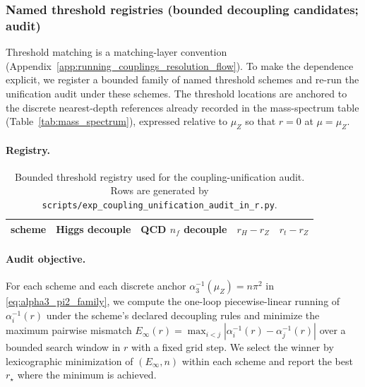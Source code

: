 \subsubsection{Named threshold registries (bounded decoupling candidates; audit)}
\label{subsec:coupling_unification_threshold_registry}
\AuditTag Threshold matching is a matching-layer convention (Appendix~\ref{app:running_couplings_resolution_flow}).
To make the dependence explicit, we register a bounded family of named threshold schemes and re-run the unification audit under these schemes.
The threshold locations are anchored to the discrete nearest-depth references already recorded in the mass-spectrum table (Table~\ref{tab:mass_spectrum}), expressed relative to $\mu_Z$ so that $r=0$ at $\mu=\mu_Z$.

\paragraph{Registry.}
\begin{table}[H]
\centering
\small
\setlength{\tabcolsep}{8pt}
\renewcommand{\arraystretch}{1.15}
\begin{tabular}{lrrrr}
\toprule
scheme & Higgs decouple & QCD $n_f$ decouple & $r_H-r_Z$ & $r_t-r_Z$ \\
\midrule
%
\end{tabular}
\caption{Bounded threshold registry used for the coupling-unification audit. Rows are generated by \texttt{scripts/exp\_coupling\_unification\_audit\_in\_r.py}.}
\label{tab:coupling_unification_threshold_registry}
\end{table}

\paragraph{Audit objective.}
\AuditTag For each scheme and each discrete anchor $\alpha_3^{-1}(\mu_Z)=n\pi^2$ in \eqref{eq:alpha3_pi2_family},
we compute the one-loop piecewise-linear running of $\alpha_i^{-1}(r)$ under the scheme's declared decoupling rules and minimize the maximum pairwise mismatch
$
E_\infty(r)=\max_{i<j}|\alpha_i^{-1}(r)-\alpha_j^{-1}(r)|
$
over a bounded search window in $r$ with a fixed grid step.
We select the winner by lexicographic minimization of $(E_\infty,n)$ within each scheme and report the best $r_\star$ where the minimum is achieved.

%

